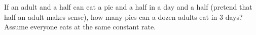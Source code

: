 If an adult and a half can eat a pie and a half in a day and a half (pretend that half an adult makes sense), how many pies can a dozen adults eat in $3$ days? Assume everyone eats at the same constant rate.
